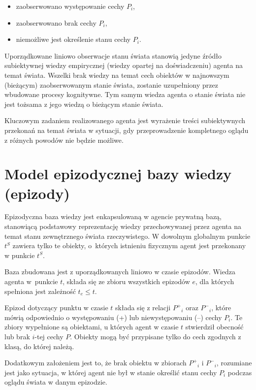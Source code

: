 	\begin{itemize}
	 	\setlength{\itemindent}{.5in}
		\item zaobserwowano występowanie cechy $ P_i $,
		\item zaobserwowano brak cechy $ P_i $,
		\item niemożliwe jest określenie stanu cechy $ P_i $.
	\end{itemize}
	
	Uporządkowane liniowo obserwacje stanu świata stanowią jedyne źródło subiektywnej wiedzy empirycznej (wiedzy opartej na doświadczeniu) agenta na temat świata. Wszelki brak wiedzy na temat cech obiektów w najnowszym (bieżącym) zaobserwowanym stanie świata, zostanie uzupełniony przez wbudowane procesy kognitywne. Tym samym wiedza agenta o stanie świata nie jest tożsama z jego wiedzą o bieżącym stanie świata.
	
	Kluczowym zadaniem realizowanego agenta jest wyrażenie treści subiektywnych przekonań na temat świata w sytuacji, gdy przeprowadzenie kompletnego oglądu z różnych powodów nie będzie możliwe.
	

\section{Model epizodycznej bazy wiedzy (epizody)}

Epizodyczna baza wiedzy jest enkapsulowaną w agencie prywatną bazą, stanowiącą podstawowy reprezentację wiedzy przechowywanej przez agenta na temat stanu zewnętrznego świata rzeczywistego. W dowolnym globalnym punkcie $ t^S $ zawiera tylko te obiekty, o~których istnieniu fizycznym agent jest przekonany w punkcie $ t^S $.

Baza zbudowana jest z uporządkowanych liniowo w czasie epizodów. Wiedza agenta w~punkcie $ t $, składa się ze zbioru wszystkich epizodów $ e $, dla których spełniona jest zależność $ t_e \le t $. 

Epizod dotyczący punktu w czasie $ t $ składa się z relacji 
$ P^+{}_i $ oraz $ P^-{}_i $, 
które mówią odpowiednio o występowaniu (+) lub niewystępowaniu (--) cechy $ P_i $. Te zbiory wypełnione są obiektami, u których agent w czasie $ t $ stwierdził obecność lub brak $ i $-tej cechy $ P $. Obiekty mogą być przypisane tylko do cech zgodnych z klasą, do której należą. 

Dodatkowym założeniem jest to, że brak obiektu w zbiorach 
$ P^+{}_i $ i $ P^-{}_i $, 
rozumiane jest jako sytuacja, w której agent nie był w stanie określić stanu cechy $ P_i $ podczas oglądu świata w danym epizodzie.

